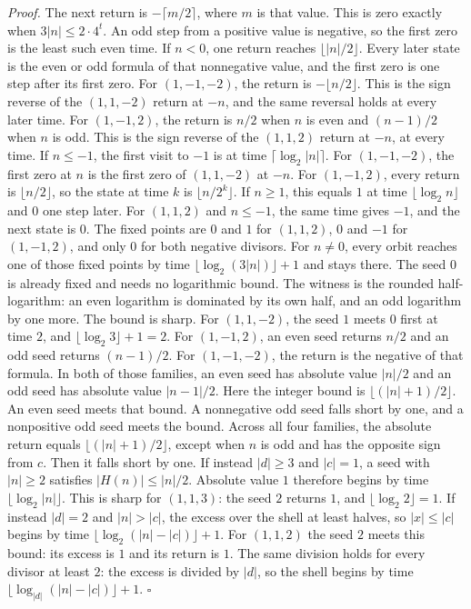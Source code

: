 \documentclass[11pt,letterpaper]{article}
\newenvironment{proof}{\noindent\textit{Proof.}}{\hfill\(\square\)}
\begin{document}
\begin{proof}
The next return is \(-\lceil m/2\rceil\), where \(m\) is that value. This is zero exactly when \(3\lvert n\rvert\le 2\cdot 4^{t}\). An odd step from a positive value is negative, so the first zero is the least such even time. If \(n<0\), one return reaches \(\lfloor\lvert n\rvert/2\rfloor\). Every later state is the even or odd formula of that nonnegative value, and the first zero is one step after its first zero. For \((1,-1,-2)\), the return is \(-\lfloor n/2\rfloor\). This is the sign reverse of the \((1,1,-2)\) return at \(-n\), and the same reversal holds at every later time. For \((1,-1,2)\), the return is \(n/2\) when \(n\) is even and \((n-1)/2\) when \(n\) is odd. This is the sign reverse of the \((1,1,2)\) return at \(-n\), at every time. If \(n\le -1\), the first visit to \(-1\) is at time \(\lceil\log_2\lvert n\rvert\rceil\). For \((1,-1,-2)\), the first zero at \(n\) is the first zero of \((1,1,-2)\) at \(-n\). For \((1,-1,2)\), every return is \(\lfloor n/2\rfloor\), so the state at time \(k\) is \(\lfloor n/2^{k}\rfloor\). If \(n\ge 1\), this equals \(1\) at time \(\lfloor\log_2 n\rfloor\) and \(0\) one step later. For \((1,1,2)\) and \(n\le -1\), the same time gives \(-1\), and the next state is \(0\). The fixed points are \(0\) and \(1\) for \((1,1,2)\), \(0\) and \(-1\) for \((1,-1,2)\), and only \(0\) for both negative divisors. For \(n\ne0\), every orbit reaches one of those fixed points by time \(\lfloor\log_2(3\lvert n\rvert)\rfloor+1\) and stays there. The seed \(0\) is already fixed and needs no logarithmic bound. The witness is the rounded half-logarithm: an even logarithm is dominated by its own half, and an odd logarithm by one more. The bound is sharp. For \((1,1,-2)\), the seed \(1\) meets \(0\) first at time \(2\), and \(\lfloor\log_2 3\rfloor+1=2\). For \((1,-1,2)\), an even seed returns \(n/2\) and an odd seed returns \((n-1)/2\). For \((1,-1,-2)\), the return is the negative of that formula. In both of those families, an even seed has absolute value \(\lvert n\rvert/2\) and an odd seed has absolute value \(\lvert n-1\rvert/2\). Here the integer bound is \(\lfloor(\lvert n\rvert+1)/2\rfloor\). An even seed meets that bound. A nonnegative odd seed falls short by one, and a nonpositive odd seed meets the bound. Across all four families, the absolute return equals \(\lfloor(\lvert n\rvert+1)/2\rfloor\), except when \(n\) is odd and has the opposite sign from \(c\). Then it falls short by one. If instead \(\lvert d\rvert\ge 3\) and \(\lvert c\rvert=1\), a seed with \(\lvert n\rvert\ge 2\) satisfies \(\lvert H(n)\rvert\le\lvert n\rvert/2\). Absolute value \(1\) therefore begins by time \(\lfloor\log_2\lvert n\rvert\rfloor\). This is sharp for \((1,1,3)\): the seed \(2\) returns \(1\), and \(\lfloor\log_2 2\rfloor=1\). If instead \(\lvert d\rvert=2\) and \(\lvert n\rvert>\lvert c\rvert\), the excess over the shell at least halves, so \(\lvert x\rvert\le\lvert c\rvert\) begins by time \(\lfloor\log_2(\lvert n\rvert-\lvert c\rvert)\rfloor+1\). For \((1,1,2)\) the seed \(2\) meets this bound: its excess is \(1\) and its return is \(1\). The same division holds for every divisor at least \(2\): the excess is divided by \(\lvert d\rvert\), so the shell begins by time \(\lfloor\log_{\lvert d\rvert}(\lvert n\rvert-\lvert c\rvert)\rfloor+1\). 
\end{proof}
\end{document}
